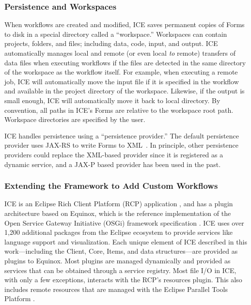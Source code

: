 \subsubsection{Persistence and
Workspaces}\label{persistence-and-workspaces}

When workflows are created and modified, ICE saves permanent copies of 
Forms to disk in a special directory called a ``workspace.''
Workspaces can contain projects, folders, and files; including data,
code, input, and output. ICE automatically manages local and remote (or
even local \emph{to} remote) transfers of data files when executing
workflows if the files are detected in the same directory of the
workspace as the workflow itself. For example, when executing a remote
job, ICE will automatically move the input file if it is specified in
the workflow and available in the project directory of the workspace.
Likewise, if the output is small enough, ICE will automatically move it back
to local directory. By convention, all paths in ICE's Forms are
relative to the workspace root path. Workspace directories are specified
by the user.

ICE handles persistence using a ``persistence provider.'' The
default persistence provider uses JAX-RS to write Forms to 
XML~\cite{burke_restful_2010}. In principle, other persistence providers 
could replace the XML-based provider since it is registered as a dynamic 
service, and a JAX-P based provider has been used in the past.

\subsubsection{Extending the Framework to Add Custom
Workflows}\label{framework}

ICE is an Eclipse Rich Client Platform (RCP) application
\cite{mcaffer_eclipse_2010}, and has a plugin architecture based on 
Equinox, which is the reference implementation of the Open Service Gateway Initiative (OSGi) 
framework specification \cite{mcaffer_osgi_2010}. ICE uses over 1,200 additional
packages from the Eclipse ecosystem to provide services like language
support and visualization. Each unique element of ICE described
in this work---including the Client, Core, Items, and data structures---are 
provided as plugins to Equinox. Most plugins are managed
dynamically and provided as services that can be obtained through a
service registry. Most file I/O in ICE, with only a few exceptions,
interacts with the RCP's resources plugin. This also includes remote
resources that are managed with the Eclipse Parallel Tools Platform
\cite{tibbitts_integrated_2009}.

